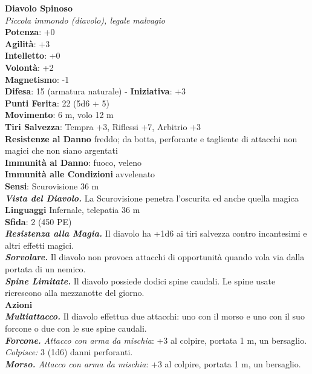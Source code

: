 \begin{multicols}{2}
\medskip\textbf{Diavolo Spinoso}\\
\emph{Piccola immondo (diavolo), legale malvagio}\\
\textbf{Potenza}: +0\\
\textbf{Agilità}: +3\\
\textbf{Intelletto}: +0\\
\textbf{Volontà}: +2\\
\textbf{Magnetismo}: -1\\
\textbf{Difesa}: 15 (armatura naturale) - \textbf{Iniziativa}: +3\\
\textbf{Punti Ferita}: 22 (5d6 + 5)\\
\textbf{Movimento}: 6 m, volo 12 m\\
\textbf{Tiri Salvezza}: Tempra +3, Riflessi +7, Arbitrio +3\\
\textbf{Resistenze al Danno} freddo; da botta, perforante e tagliente di attacchi non magici che non siano argentati\\
\textbf{Immunità al Danno}: fuoco, veleno \\
\textbf{Immunità alle Condizioni} avvelenato\\
\textbf{Sensi}: Scurovisione 36 m\\
\emph{\textbf{Vista del Diavolo.}} La Scurovisione penetra l'oscurita ed anche quella magica\\
\textbf{Linguaggi} Infernale, telepatia 36 m \\
\textbf{Sfida}: 2 (450 PE)\smallskip\\
\emph{\textbf{Resistenza alla Magia.}} Il diavolo ha +1d6 ai tiri salvezza contro incantesimi e altri effetti magici.\\
\emph{\textbf{Sorvolare.}} Il diavolo non provoca attacchi di opportunità quando vola via dalla portata di un nemico.\\
\emph{\textbf{Spine Limitate.}} Il diavolo possiede dodici spine caudali. Le spine usate ricrescono alla mezzanotte del giorno.\\
\smallskip\textbf{Azioni}\\
\emph{\textbf{Multiattacco.}} Il diavolo effettua due attacchi: uno con il morso e uno con il suo forcone o due con le sue spine caudali.\\
\emph{\textbf{Forcone.} Attacco con arma da mischia}: +3 al colpire, portata 1 m, un bersaglio.\\
\emph{Colpisce:} 3 (1d6) danni perforanti. \\
\emph{\textbf{Morso.} Attacco con arma da mischia}: +3 al colpire, portata 1 m, un bersaglio.\\

\end{multicols}
